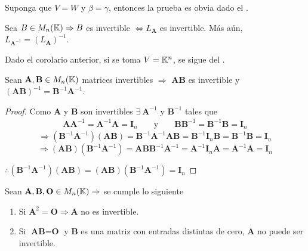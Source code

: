\begin{orangeproof}
    Suponga que $V=W$ y $\beta=\gamma$, entonces la prueba es obvia dado el .
\end{orangeproof}

\begin{corollary}
    Sea $B \in M_n(\mathbb{K}) \Rightarrow B$ es invertible $\iff {L}_{\textbf{A}}$ es invertible. Más aún, $L_{{\textbf{A}}^{-1}}=(L_{\textbf{A}})^{-1}$. 
\end{corollary}

\begin{orangeproof}
    Dado el corolario anterior, si se toma $V=\mathbb{K}^n$, se sigue del .
\end{orangeproof}

\begin{theorem}
    Sean $\textbf{A}, \textbf{B} \in M_n(\mathbb{K})$ matrices invertibles $\Rightarrow$ $\textbf{AB}$ es invertible y $(\textbf{AB})^{-1}={\textbf{B}}^{-1}{\textbf{A}}^{-1}$.
\end{theorem}

\begin{proof}
    Como $\textbf{A}$ y $\textbf{B}$ son invertibles $\exists \: {\textbf{A}}^{-1} $ y $ {\textbf{B}}^{-1}$ tales que 
    \begin{align*}
      \textbf{A}{\textbf{A}}^{-1}={\textbf{A}}^{-1}\textbf{A}={\textbf{I}}_{n}  && \text{ y } && \textbf{B}{\textbf{B}}^{-1}={\textbf{B}}^{-1}\textbf{B}={\textbf{I}}_{n}
    \end{align*}
     $$\Rightarrow ({\textbf{B}}^{-1}{\textbf{A}}^{-1})(\textbf{AB})={\textbf{B}}^{-1}{\textbf{A}}^{-1}\textbf{AB}={\textbf{B}}^{-1}{\textbf{I}}_{n}\textbf{B}={\textbf{B}}^{-1}\textbf{B}={\textbf{I}}_{n}$$
    $$\Rightarrow (\textbf{AB})({\textbf{B}}^{-1}{\textbf{A}}^{-1})=\textbf{AB}{\textbf{B}}^{-1}{\textbf{A}}^{-1}={\textbf{A}}^{-1}{\textbf{I}}_{n}\textbf{A}={\textbf{A}}^{-1}\textbf{A}={\textbf{I}}_{n}$$ 
    
    $\therefore ({\textbf{B}}^{-1}{\textbf{A}}^{-1})(\textbf{AB})=(\textbf{AB})({\textbf{B}}^{-1}{\textbf{A}}^{-1})={\textbf{I}}_{n}$
\end{proof}

\begin{theorem} \label{theom2221}
    Sean $\textbf{A},\textbf{B},\textbf{O} \in M_n(\mathbb{K}) \Rightarrow$ se cumple lo siguiente 
    
    \begin{enumerate}
        \item Si ${\textbf{A}}^2=\textbf{O} \Rightarrow \textbf{A}$ no es invertible.
        \item Si $\textbf{AB}=\textbf{O}$ y $\textbf{B}$ es una matriz con entradas distintas de cero, $\textbf{A}$ no puede ser invertible.
    \end{enumerate} 
\end{theorem}

